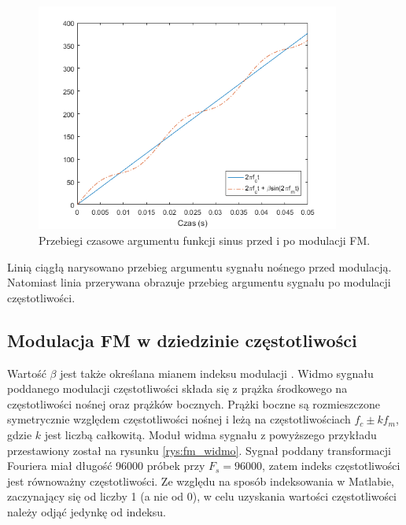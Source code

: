 \begin{figure}[H]
	\centering
	\includegraphics[width=10cm]{grafiki/fm_arg}
	\captionsetup{justification=centering}
	\caption{Przebiegi czasowe argumentu funkcji sinus przed i po modulacji FM.}
	\label{rys:fm_arg}
\end{figure}
Linią ciągłą narysowano przebieg argumentu sygnału nośnego przed modulacją. Natomiast linia przerywana obrazuje przebieg argumentu sygnału po modulacji częstotliwości.
\subsection{Modulacja FM w dziedzinie częstotliwości}
Wartość $\beta$ jest także określana mianem indeksu modulacji \cite{chowning}. Widmo sygnału poddanego modulacji częstotliwości składa się z prążka środkowego na częstotliwości nośnej oraz prążków bocznych. Prążki boczne są rozmieszczone symetrycznie względem częstotliwości nośnej i leżą na częstotliwościach $f_c \pm kf_m$, gdzie $k$ jest liczbą całkowitą. Moduł widma sygnału z powyższego przykładu przestawiony został na rysunku \ref{rys:fm_widmo}. Sygnał poddany transformacji Fouriera miał długość 96000 próbek przy $F_s = 96000$, zatem indeks częstotliwości jest równoważny częstotliwości. Ze względu na sposób indeksowania w Matlabie, zaczynający się od liczby 1 (a nie od 0), w celu uzyskania wartości częstotliwości należy odjąć jedynkę od indeksu.

